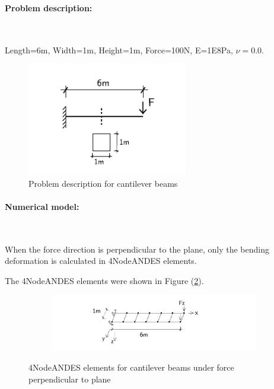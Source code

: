 \documentclass[fleqn,11pt]{article}
\begin{document}
\paragraph{Problem description:} ~

Length=6m, Width=1m, Height=1m, Force=100N, E=1E8Pa, $\nu=0.0$. 

\begin{figure}[H]
  \centering
  \includegraphics[width=7cm]{../Figure-files/cantilever_6.pdf}
  \caption{Problem description for cantilever beams}
  \label{fig Problem description for cantilever 4}
\end{figure}


\paragraph{Numerical model:} ~

\vskip 12pt

When the force direction is perpendicular to the plane, only the bending deformation is calculated in 4NodeANDES elements. 


The 4NodeANDES elements were shown in Figure (\ref{fig 4NodeANDES elements for cantilever beams under force perpendicular to plane}).

\begin{figure}[H]
  \centering
  \begin{subfigure}{0.5\textwidth}
    \centering
    \includegraphics[width=10cm]{../Figure-files/beam_ANDES_xy_bending_6div.pdf}
  \end{subfigure}
  \captionsetup{justification=centering,margin=3cm}
  \caption{4NodeANDES elements for cantilever beams under force perpendicular to plane}
  \label{fig 4NodeANDES elements for cantilever beams under force perpendicular to plane}
\end{figure}
\end{document}
